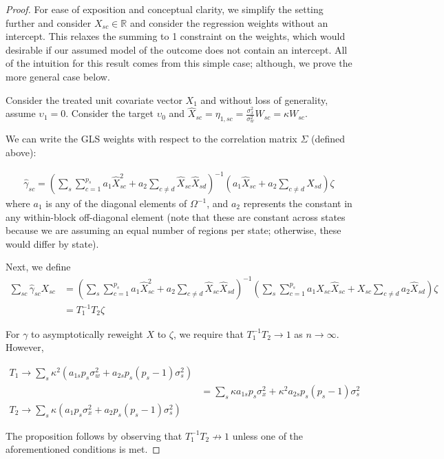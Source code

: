 \begin{proof}
For ease of exposition and conceptual clarity, we simplify the setting further and consider $X_{sc} \in \mathbb{R}$ and consider the regression weights without an intercept. This relaxes the summing to 1 constraint on the weights, which would desirable if our assumed model of the outcome does not contain an intercept. All of the intuition for this result comes from this simple case; although, we prove the more general case below.

Consider the treated unit covariate vector $X_1$ and without loss of generality, assume $\upsilon_1 = 0$. Consider the target $\upsilon_0$ and $\hat{X}_{sc} = \eta_{1, sc} = \frac{\sigma^2_x}{\sigma^2_w}W_{sc} = \kappa W_{sc}$. 

We can write the GLS weights with respect to the correlation matrix $\Sigma$ (defined above):

\begin{align*}
\hat{\gamma}_{sc} = (\sum_{s}\sum_{c=1}^{p_s} a_{1} \hat{X}_{sc}^2 + a_{2} \sum_{c\ne d} \hat{X}_{sc}\hat{X}_{sd})^{-1}(a_{1}\hat{X}_{sc} + a_{2}\sum_{c\ne d} \hat{X}_{sd})\zeta
\end{align*}
%
where $a_1$ is any of the diagonal elements of $\Omega^{-1}$, and $a_2$ represents the constant in any within-block off-diagonal element (note that these are constant across states because we are assuming an equal number of regions per state; otherwise, these would differ by state).

Next, we define 
    \begin{align*}
        \sum_{sc} \hat{\gamma}_{sc} X_{sc} &= (\sum_{s}\sum_{c=1}^{p_s} a_{1} \hat{X}_{sc}^2 + a_{2} \sum_{c\ne d} \hat{X}_{sc}\hat{X}_{sd})^{-1}(\sum_{s}\sum_{c=1}^{p_s}a_{1}X_{sc}\hat{X}_{sc} + X_{sc}\sum_{c\ne d}a_{2}\hat{X}_{sd})\zeta \\
        &= T_1^{-1}T_2\zeta
    \end{align*}

For $\gamma$ to asymptotically reweight $X$ to $\zeta$, we require that $T_1^{-1}T_2 \to 1$ as $n \to \infty$. However,

    \begin{align*}
        T_1 \to \sum_s \kappa^2 (a_{1s} p_s\sigma^2_w + a_{2s} p_s(p_s - 1)\sigma^2_s)\\
        &= \sum_s \kappa a_{1s} p_s\sigma^2_x + \kappa^2a_{2s}p_s(p_s - 1)\sigma^2_s \\
        T_2 \to \sum_s \kappa (a_{1} p_s\sigma^2_x + a_{2}p_s(p_s - 1)\sigma^2_s)
    \end{align*}
    
 The proposition follows by observing that $T_1^{-1}T_2 \not\to 1$ unless one of the aforementioned conditions is met.
\end{proof}    
    
